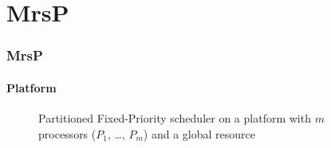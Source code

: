 


% 


\section{MrsP}

	\begin{frame}
	\frametitle{MrsP}
	\framesubtitle{Platform}	

		\begin{figure}
			\centering
			\scalebox{.8}{\mrspSlideBis}
			\caption{Partitioned Fixed-Priority scheduler on a platform with $m$ processors ($P_1$, \dots, $P_m$) and a global resource}
		\end{figure}

	\end{frame}







	

